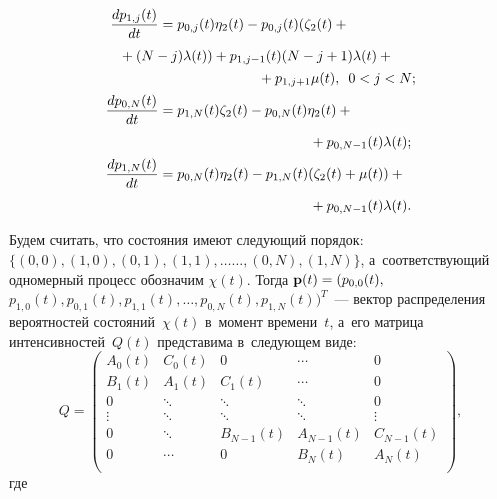 \begin{multicols}{2}
\noindent
     \begin{align*}
           \fr{dp_{1,j}(t)}{dt}& = p_{0,j}(t)\eta_2(t)-p_{0,j}(t)(\zeta_2(t)+{}\\[1pt]
   &\hspace*{-10mm}{}+(N-j)\lambda(t)) + p_{1,j-1}(t)(N-j+1)\lambda(t) +{}\\[1pt]
&   \hspace*{25mm}{}+ p_{1, j+1}\mu(t),\enskip 0<j<N;\\[1pt]
    \fr{dp_{0,N}(t)}{dt} &= p_{1,N}(t)\zeta_2(t)-p_{0,N}(t)\eta_2(t)+ {}\\[1pt]
    &\hspace*{38mm}{}+ p_{0,N-1}(t)\lambda(t);
    \\[1pt]
    \fr{dp_{1,N}(t)}{dt}& = p_{0,N}(t)\eta_2(t)-p_{1,N}(t)(\zeta_2(t)+\mu(t))+{}\\[1pt]
&\hspace*{38mm}{}+     p_{0,N-1}(t)\lambda(t).
    \end{align*}
    

    Будем считать, что со\-сто\-яния имеют сле\-ду\-ющий порядок: $\{(0,0), (1,0), 
(0,1), (1, 1), \ldots$\linebreak $\ldots, (0, N), (1, N)\}$, а~со\-от\-вет\-ст\-ву\-ющий одномерный процесс 
обозначим $\chi(t)$. Тогда $\mathbf{p}(t)\hm=(p_{0,0}(t),$\linebreak $p_{1,0}(t), p_{0,1}(t), 
p_{1,1}(t), \ldots, p_{0,N}(t), p_{1,N}(t))^T$~--- век\-тор рас\-пре\-де\-ле\-ния 
вероятностей со\-сто\-яний~$\chi(t)$ в~момент времени~$t$, а~его мат\-ри\-ца 
интенсивностей~$Q(t)$ пред\-ста\-ви\-ма в~сле\-ду\-ющем \mbox{виде}:
\begin{equation*} 
Q =
                \begin{pmatrix}
                        A_0(t)     & C_0(t)  &  0            & \cdots            & 0  \\[1pt]
                        B_1(t) & A_1(t)     & C_1(t)  & \cdots       & 0  \\[1pt]
                        0      &   \ddots       & \ddots    & \ddots  & 0  \\[1pt]
                        \vdots& \ddots& \ddots&\ddots& \vdots\\[1pt]
                        0      & \ddots            &  B_{N-1}(t)      & A_{N-1}(t)  & C_{N-1}(t)  \\[1pt]
                        0& \cdots        & 0       &B_{N}(t)       & A_{N}(t)  \\[1pt]
                \end{pmatrix},
            \end{equation*}
где


\end{multicols}
